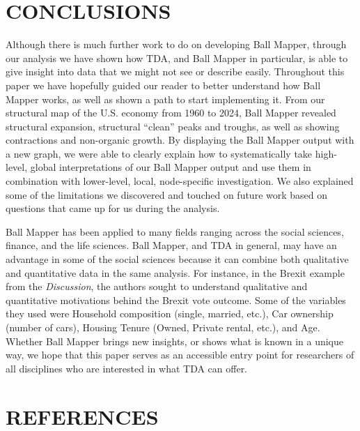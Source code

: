 \documentclass[
  10pt,
  letterpaper,
  DIV=11,
  numbers=noendperiod]{scrartcl}
\begin{document}
\section{CONCLUSIONS}\label{conclusions}

Although there is much further work to do on developing Ball Mapper,
through our analysis we have shown how TDA, and Ball Mapper in
particular, is able to give insight into data that we might not see or
describe easily. Throughout this paper we have hopefully guided our
reader to better understand how Ball Mapper works, as well as shown a
path to start implementing it. From our structural map of the U.S.
economy from 1960 to 2024, Ball Mapper revealed structural expansion,
structural ``clean'' peaks and troughs, as well as showing contractions
and non-organic growth. By displaying the Ball Mapper output with a new
graph, we were able to clearly explain how to systematically take
high-level, global interpretations of our Ball Mapper output and use
them in combination with lower-level, local, node-specific
investigation. We also explained some of the limitations we discovered
and touched on future work based on questions that came up for us during
the analysis.

Ball Mapper has been applied to many fields ranging across the social
sciences, finance, and the life sciences. Ball Mapper, and TDA in
general, may have an advantage in some of the social sciences because it
can combine both qualitative and quantitative data in the same analysis.
For instance, in the Brexit example from the \emph{Discussion}, the
authors sought to understand qualitative and quantitative motivations
behind the Brexit vote outcome. Some of the variables they used were
Household composition (single, married, etc.), Car ownership (number of
cars), Housing Tenure (Owned, Private rental, etc.), and Age. Whether
Ball Mapper brings new insights, or shows what is known in a unique way,
we hope that this paper serves as an accessible entry point for
researchers of all disciplines who are interested in what TDA can offer.

\section{REFERENCES}\label{references}
\end{document}
